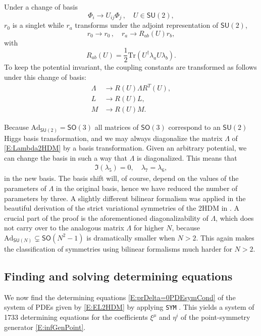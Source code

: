 \documentclass[a4paper,hidelinks, 12pt]{article}
\numberwithin{equation}{section}
\theoremstyle{plain}
\newcommand{\Lg}{\mathsf}
\begin{document}
Under a change of basis
\begin{equation}\label{E:HbasisCh}
\Phi_i \rightarrow U_{ij}\Phi_j\, , \quad  U\in \Lg{SU}(2),
\end{equation}
 $r_0$ is a singlet while $r_a$ transforms under the adjoint representation of $\Lg{SU}(2)$,
\begin{equation}
r_0 \rightarrow r_0 \,, \quad r_a\rightarrow R_{ab}(U)r_b,
\end{equation}
with
\begin{equation}\label{E:R(U)}
R_{ab}(U) = \frac{1}{2}\text{Tr}(U^\dagger \lambda_a U \lambda_b).
\end{equation}
To keep the potential invariant, 
the coupling constants are transformed as follows under this change of basis:
\begin{align}
\label{E:LambdaTrafoU}
\Lambda &\to R(U) \Lambda R^T(U),\\
L &\to R(U) L, \\
M &\to R(U) M. 
\end{align}

Because $\text{Ad}_{\Lg{SU}(2)}=\Lg{SO}(3)$ all matrices of $\Lg{SO}(3)$ correspond to an $\Lg{SU}(2)$ Higgs basis transformation, and we may always diagonalize the matrix $\Lambda$ of \eqref{E:Lambda2HDM} by a basis transformation. Given an arbitrary potential, we can change the basis in such a way that
$\Lambda$
is diagonalized. This means that 
\begin{align}\label{E:diagLambdapars}
	\Im(\lambda_5)=0, \quad \lambda_7=\lambda_6,
\end{align}
in the new basis. The basis shift will, of course, depend on the values of the parameters of $\Lambda$ in the original basis, hence we have reduced the number of parameters by three.
A slightly different bilinear formalism was applied in the beautiful derivation of the strict variational symmetries of the 2HDM in
\cite{PhysRevD.77.015017}. A crucial part of the proof is the aforementioned diagonalizability of $\Lambda$, which does not carry over to the analogous matrix $\Lambda$
 for higher $N$, because $\text{Ad}_{\Lg{SU}(N)}\varsubsetneq \Lg{SO}(N^2-1)$ is dramatically smaller when $N>2$. This again makes the classification of symmetries using bilinear formalisms much harder for $N>2$.

\subsection{Finding and solving determining equations}
\label{sec:FindingAndSolvingTheDeterminingEquations}
We now find the determining equations 
\eqref{E:prDelta=0PDEsymCond} of the system of PDEs given by \eqref{E:EL2HDM}
by applying \texttt{SYM} \cite{dimas2005sym}. This yields a system of 1733
determining equations for the coefficients $\xi^\mu$ and $\eta^i$ of the
point-symmetry generator \eqref{E:infGenPoint}.
\end{document}
